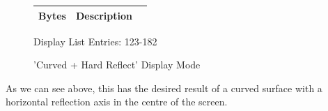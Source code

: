 \begin{minipage}[b]{0.31\linewidth}
  \begin{figure}[H]
    {
      \setlength{\tabcolsep}{3.0pt}
      \setlength\cmidrulewidth{\heavyrulewidth} %
      \begin{adjustbox}{height=8.5cm}

        \begin{tabular}{lll}
          \toprule
          Bytes       & Description                                                         \\
          \midrule
        \end{tabular}

      \end{adjustbox}

    }\caption*{Display List Entries: 123-182}
  \end{figure}
\end{minipage}

\clearpage
\begin{figure}[H]
    \centering
    \begin{adjustbox}{width=12cm,center}
    \end{adjustbox}
\caption{'Curved + Hard Reflect' Display Mode}
\end{figure}

As we can see above, this has the desired result of a curved surface with a horizontal reflection axis in the
centre of the screen.

